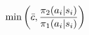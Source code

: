 \documentclass[preview]{standalone}
\begin{document}
\begin{align*}
\special{dvisvgm:raw <g id='unique000'>}\min \left(\bar{c},\frac{\pi_{2}(a_i|s_i)}{\pi_{1}(a_i|s_i)} \right)\special{dvisvgm:raw </g>}
\end{align*}
\end{document}
